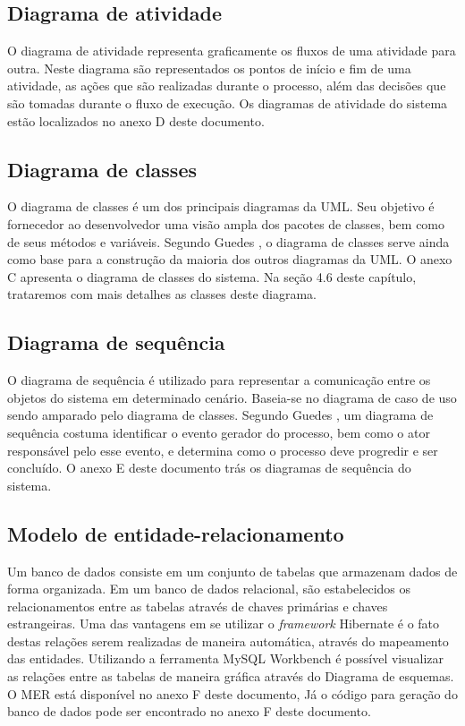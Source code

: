 \subsection{Diagrama de atividade}

O diagrama de atividade representa graficamente os fluxos de uma atividade para outra. Neste diagrama são representados os pontos de início e fim de uma atividade, as ações que são realizadas durante o processo, além das decisões que são tomadas durante o fluxo de execução. Os diagramas de atividade do sistema estão localizados no anexo D deste documento.

\subsection{Diagrama de classes}


O diagrama de classes é um dos principais diagramas da UML. Seu objetivo é fornecedor ao desenvolvedor uma visão ampla dos pacotes de classes, bem como de seus métodos e variáveis. Segundo Guedes \cite{guedes2018uml}, o diagrama de classes serve ainda como base para a construção da maioria dos outros diagramas da UML.
O anexo C apresenta o diagrama de classes do sistema.
Na seção 4.6 deste capítulo, trataremos com mais detalhes as classes deste diagrama.


\subsection{Diagrama de sequência}

O diagrama de sequência é utilizado para representar a comunicação entre os objetos do sistema em determinado cenário. Baseia-se no diagrama de caso de uso sendo amparado pelo diagrama de classes. 
Segundo Guedes \cite{guedes2018uml}, um diagrama de sequência costuma identificar o evento gerador do processo, bem como o ator responsável pelo esse evento, e determina como o processo deve progredir e ser concluído. O anexo E deste documento trás os diagramas de sequência do sistema.




\subsection{Modelo de entidade-relacionamento}
Um banco de dados consiste em um conjunto de tabelas que armazenam dados de forma organizada.
Em um banco de dados relacional, são estabelecidos os relacionamentos entre as tabelas através de chaves primárias e chaves estrangeiras. 
Uma das vantagens em se utilizar o \textit{framework} Hibernate é o fato destas relações serem realizadas de maneira automática, através do mapeamento das entidades.
Utilizando a ferramenta MySQL Workbench é possível visualizar as relações entre as tabelas de maneira gráfica através do Diagrama de esquemas. O MER está disponível no anexo F deste documento,
Já o código para geração do banco de dados pode ser encontrado no anexo F deste documento.


